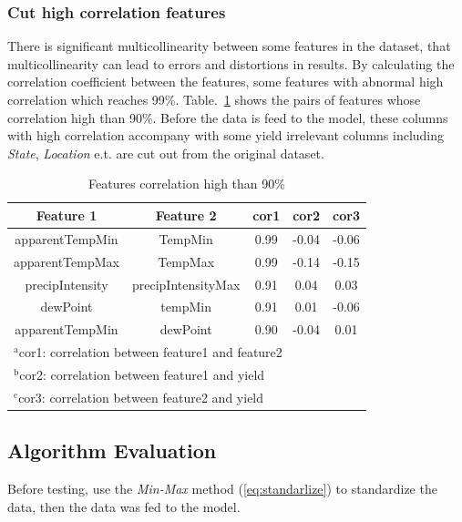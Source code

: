\documentclass[conference, a4paper]{IEEEtran}
\begin{document}
  \subsubsection{Cut high correlation features}
    There is significant multicollinearity between some features in the dataset, that multicollinearity can lead to errors and distortions in results\cite{farrarMulticollinearityRegressionAnalysis1967}. By calculating the correlation coefficient between the features, some features with abnormal high correlation which reaches 99\%. Table.~\ref{tab:correlation} shows the pairs of features whose correlation high than 90\%. Before the data is feed to the model, these columns with high correlation accompany with some yield irrelevant columns including \textit{State}, \textit{Location} e.t. are cut out from the original dataset.
    \begin{table}[htbp]
      \caption{Features correlation high than 90\%}
      \begin{center}
        \begin{tabular}{|c|c|c|c|c|}
          \hline
          Feature 1 & Feature 2 & cor1 & cor2 & cor3\\
          \hline
          apparentTempMin & TempMin     & 0.99 & -0.04 & -0.06 \\
          apparentTempMax & TempMax     & 0.99 & -0.14 & -0.15 \\
          precipIntensity & precipIntensityMax & 0.91 & 0.04  & 0.03  \\
          dewPoint & tempMin & 0.91 & 0.01  & -0.06 \\
          apparentTempMin & dewPoint & 0.90 & -0.04 & 0.01 \\
          \hline
          \multicolumn{5}{l}{$^{\mathrm{a}}$cor1: correlation between feature1 and feature2} \\
          \multicolumn{5}{l}{$^{\mathrm{b}}$cor2: correlation between feature1 and yield} \\ 
          \multicolumn{5}{l}{$^{\mathrm{c}}$cor3: correlation between feature2 and yield} \\
        \end{tabular}
        \label{tab:correlation}
      \end{center}
    \end{table}

  \subsection{Algorithm Evaluation}
    Before testing, use the \textit{Min-Max} method (\ref{eq:standarlize}) to standardize the data, then the data was fed to the model.
\end{document}
